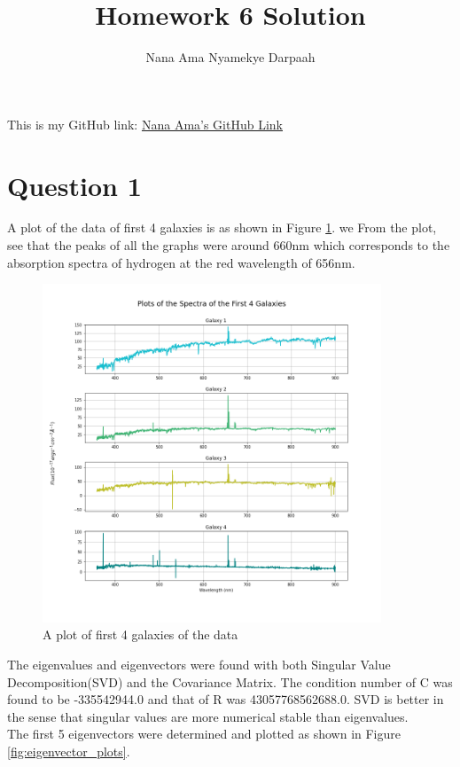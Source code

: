 \documentclass[11pt]{article}
\title{Homework 6 Solution}
\author{Nana Ama Nyamekye Darpaah}
\begin{document}
	
	\maketitle
	This is my GitHub link: \href{https://github.com/nnd2016/phys-ga2000.git}{Nana Ama's GitHub Link}
	
	\section{Question 1}
	A plot of the data of first 4 galaxies is as shown in Figure \ref{fig:galaxy_plots}.  we From the plot, see that the peaks of all the graphs were around 660nm which corresponds to the absorption spectra of hydrogen at the red wavelength of 656nm.
	
	\begin{figure}[!htb]\begin{center} 
			\vspace{12pt}
			\includegraphics[width=0.9\textwidth]{galaxy_plots.png}
			\caption{A plot of first 4 galaxies of the data }
			\label{fig:galaxy_plots} 
		\end{center}
	\end{figure}

	The eigenvalues and eigenvectors were found with both Singular Value Decomposition(SVD) and the Covariance Matrix. The condition number of C was found to be -335542944.0 and that of R was 43057768562688.0. SVD is better in the sense that singular values are more numerical stable than eigenvalues.
	\\
	The first 5 eigenvectors were determined and plotted as shown in Figure \ref{fig:eigenvector_plots}.
	
\end{document}
